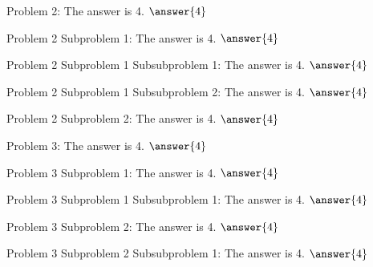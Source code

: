\documentclass{ximera}
\begin{document}
\begin{problem}\label{problem:2}
    Problem 2: The answer is 4. $\answer{4}$
    \begin{problem}\label{problem:2.1}
        Problem 2 Subproblem 1: The answer is 4. $\answer{4}$
        \begin{problem}\label{problem:2.1.1}
            Problem 2 Subproblem 1 Subsubproblem 1: The answer is 4. $\answer{4}$
        \end{problem} 
        \begin{problem}\label{problem:2.1.2}
            Problem 2 Subproblem 1 Subsubproblem 2: The answer is 4. $\answer{4}$
        \end{problem} 
    \end{problem} 
    \begin{problem}\label{problem:2.2}
        Problem 2 Subproblem 2: The answer is 4. $\answer{4}$
    \end{problem} 
\end{problem} 

\begin{problem}\label{problem:3}
    Problem 3: The answer is 4. $\answer{4}$
    \begin{problem}\label{problem:3.1}
        Problem 3 Subproblem 1: The answer is 4. $\answer{4}$
        \begin{problem}\label{problem:3.1.1}
            Problem 3 Subproblem 1 Subsubproblem 1: The answer is 4. $\answer{4}$
        \end{problem} 
    \end{problem}
    \begin{problem}\label{problem:3.2}
        Problem 3 Subproblem 2: The answer is 4. $\answer{4}$
        \begin{problem}\label{problem:3.2.1}
            Problem 3 Subproblem 2 Subsubproblem 1: The answer is 4. $\answer{4}$
        \end{problem} 
    \end{problem} 
\end{problem} 
\end{document}
